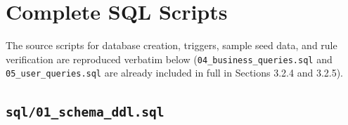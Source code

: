 \documentclass[a4paper,12pt]{report}
\begin{document}
\appendix

\chapter{Complete SQL Scripts}\label{appendix-a-complete-sql-scripts}

The source scripts for database creation, triggers, sample seed data, and rule verification are reproduced verbatim below (\texttt{04\_\allowbreak{}business\_\allowbreak{}queries.\allowbreak{}sql} and \texttt{05\_\allowbreak{}user\_\allowbreak{}queries.\allowbreak{}sql} are already included in full in Sections 3.2.4 and 3.2.5).

\section{\texorpdfstring{\texttt{sql/01\_\allowbreak{}schema\_\allowbreak{}ddl.\allowbreak{}sql}}{sql/01schemaddl.sql}}\label{a.1-sql01_schema_ddl.sql}
\end{document}
